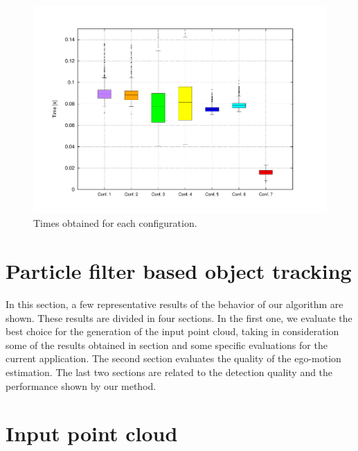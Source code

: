 \begin{figure}[h!]
\centering
\includegraphics[trim=50 40 80 60,clip]{times_average}
\caption{Times obtained for each configuration.}\label{fig:cp04_times_average}
\end{figure}

\graphicspath{{./images/chapter05/bmps/}{./images/chapter05/vects/}{./images/chapter05/}}

\section{Particle filter based object tracking}\label{ch:chapter05_02}

In this section, a few representative results of the behavior of our algorithm are shown. These results are divided in four sections. In the first one, we evaluate the best choice for the generation of the input point cloud, taking in consideration some of the results obtained in section  and some specific evaluations for the current application. The second section evaluates the quality of the ego-motion estimation. The last two sections are related to the detection quality and the performance shown by our method.

\section{Input point cloud}\label{ch:chapter05_02_01}

